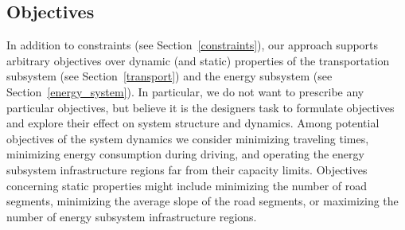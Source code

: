 \subsection{Objectives}
\label{objectives}
In addition to constraints (see Section~\ref{constraints}), our approach supports arbitrary objectives over dynamic (and static) properties of the transportation subsystem (see Section~\ref{transport}) and the energy subsystem (see Section~\ref{energy_system}). In particular, we do not want to prescribe any particular objectives, but believe it is the designers task to formulate objectives and explore their effect on system structure and dynamics. Among potential objectives of the system dynamics we consider minimizing traveling times, minimizing energy consumption during driving, and operating the energy subsystem infrastructure regions far from their capacity limits. 
Objectives concerning static properties might include minimizing the number of road segments, minimizing the average slope of the road segments, or maximizing the number of energy subsystem infrastructure regions.